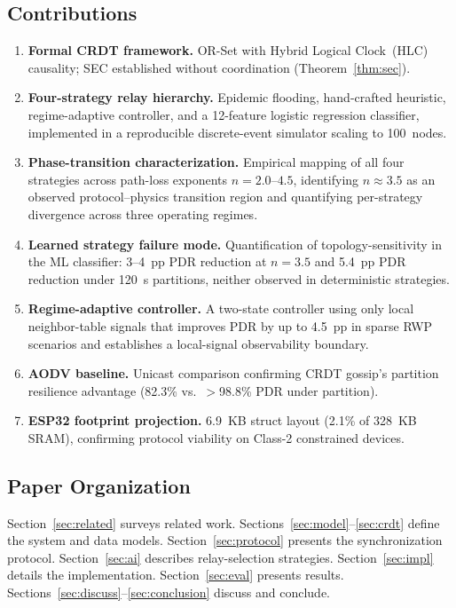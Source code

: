 \documentclass[conference]{IEEEtran}
\begin{document}
\subsection{Contributions}
\begin{enumerate}
  \item \textbf{Formal CRDT framework.}  OR-Set with Hybrid Logical Clock~(HLC)
        causality; SEC established without coordination (Theorem~\ref{thm:sec}).
  \item \textbf{Four-strategy relay hierarchy.}  Epidemic flooding, hand-crafted
        heuristic, regime-adaptive controller, and a 12-feature logistic regression
        classifier, implemented in a reproducible discrete-event simulator scaling
        to 100~nodes.
  \item \textbf{Phase-transition characterization.}  Empirical mapping of all
        four strategies across path-loss exponents $n = 2.0$--$4.5$, identifying
        $n \approx 3.5$ as an observed protocol--physics transition region and
        quantifying per-strategy divergence across three operating regimes.
  \item \textbf{Learned strategy failure mode.}  Quantification of topology-sensitivity
        in the ML classifier: 3--4~pp PDR reduction at $n = 3.5$ and 5.4~pp PDR
        reduction under 120~s partitions, neither observed in deterministic strategies.
  \item \textbf{Regime-adaptive controller.}  A two-state controller using only local
        neighbor-table signals that improves PDR by up to 4.5~pp in sparse RWP
        scenarios and establishes a local-signal observability boundary.
  \item \textbf{AODV baseline.}  Unicast comparison confirming CRDT gossip's
        partition resilience advantage (82.3\% vs.\ $>$98.8\% PDR under partition).
  \item \textbf{ESP32 footprint projection.}  6.9~KB struct layout (2.1\% of 328~KB
        SRAM), confirming protocol viability on Class-2 constrained devices.
\end{enumerate}

\subsection{Paper Organization}
Section~\ref{sec:related} surveys related work.  Sections~\ref{sec:model}--\ref{sec:crdt}
define the system and data models.  Section~\ref{sec:protocol} presents the
synchronization protocol.  Section~\ref{sec:ai} describes relay-selection strategies.
Section~\ref{sec:impl} details the implementation.  Section~\ref{sec:eval} presents
results.  Sections~\ref{sec:discuss}--\ref{sec:conclusion} discuss and conclude.
\end{document}
